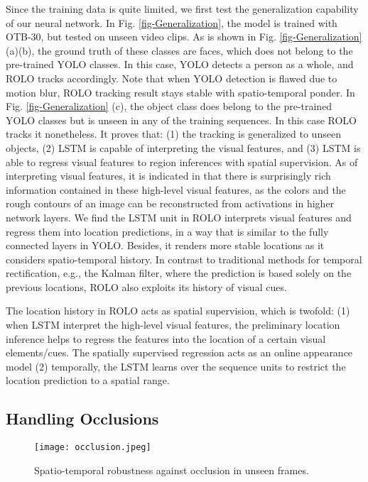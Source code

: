\documentclass{article}
\begin{document}
Since the training data is quite limited, we first test the generalization capability of our neural network.
In Fig. \ref{fig-Generalization}, the model is trained with OTB-30, but tested on unseen video clips. As is shown in Fig. \ref{fig-Generalization} (a)(b), the ground truth of these classes are faces, which does not belong to the pre-trained YOLO classes. In this case, YOLO detects a person as a whole, and ROLO tracks accordingly. Note that when YOLO detection is flawed due to motion blur, ROLO tracking result stays stable with spatio-temporal ponder. In Fig. \ref{fig-Generalization} (c), the object class does belong to the pre-trained YOLO classes but is unseen in any of the training sequences. In this case ROLO tracks it nonetheless.
It proves that: (1) the tracking is generalized to unseen objects, (2) LSTM is capable of interpreting the visual features, and (3) LSTM is able to regress visual features to region inferences with spatial supervision.
As of interpreting visual features, it is indicated in \citep{dosovitskiy2015inverting} that there is surprisingly rich information contained in these high-level visual features, as the colors and the rough contours of an image can be reconstructed from activations in higher network layers. %
We find the LSTM unit in ROLO interprets visual features and regress them into location predictions, in a way that is similar to the fully connected layers in YOLO. Besides, it renders more stable locations as it considers spatio-temporal history. In contrast to traditional methods for temporal rectification, e.g., the Kalman filter, where the prediction is based solely on the previous locations, ROLO also exploits its history of visual cues.

The location history in ROLO acts as spatial supervision, which is twofold: (1) when LSTM interpret the high-level visual features, the preliminary location inference helps to regress the features into the location of a certain visual elements/cues. The spatially supervised regression acts as an online appearance model (2) temporally, the LSTM learns over the sequence units to restrict the location prediction to a spatial range.

\subsection{Handling Occlusions}
\begin{figure}[h] %
	\centering
	\captionsetup{justification=centering}
	\texttt{[image: occlusion.jpeg]}
	\caption{Spatio-temporal robustness against occlusion in unseen frames.}
	\label{fig-occlusion}
\end{figure}
\end{document}
